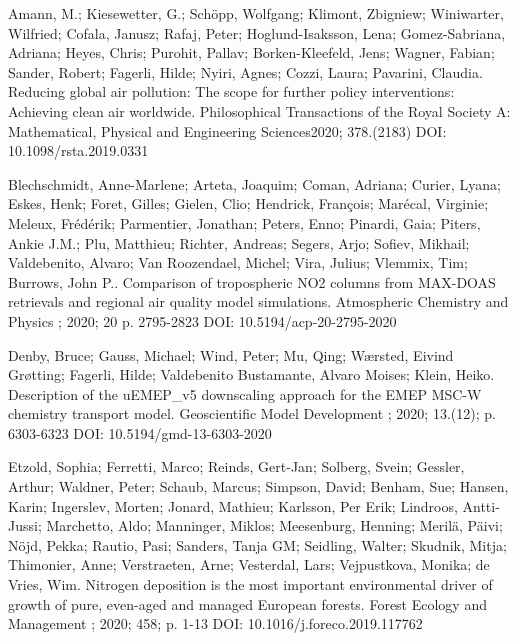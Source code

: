 \enlargethispage{\baselineskip}
\begin{list}{}{\setlength{\leftmargin}{15pt}\setlength{\itemindent}{-\leftmargin}}\small
\item[]
Amann, M.; Kiesewetter, G.; Schöpp, Wolfgang; Klimont, Zbigniew; Winiwarter, Wilfried; Cofala, Janusz; Rafaj, Peter; Hoglund-Isaksson, Lena; Gomez-Sabriana, Adriana; Heyes, Chris; Purohit, Pallav; Borken-Kleefeld, Jens; Wagner, Fabian; Sander, Robert; Fagerli, Hilde; Nyiri, Agnes; Cozzi, Laura; Pavarini, Claudia.
Reducing global air pollution: The scope for further policy interventions: Achieving clean air worldwide.
Philosophical Transactions of the Royal Society A: Mathematical, Physical and Engineering Sciences2020; 378.(2183)
DOI: 10.1098/rsta.2019.0331

\item[]
Blechschmidt, Anne-Marlene; Arteta, Joaquim; Coman, Adriana; Curier, Lyana; Eskes, Henk; Foret, Gilles; Gielen, Clio; Hendrick, François; Marécal, Virginie; Meleux, Frédérik; Parmentier, Jonathan; Peters, Enno; Pinardi, Gaia; Piters, Ankie J.M.; Plu, Matthieu; Richter, Andreas; Segers, Arjo; Sofiev, Mikhail; Valdebenito, Alvaro; Van Roozendael, Michel; Vira, Julius; Vlemmix, Tim; Burrows, John P..
Comparison of tropospheric NO2 columns from MAX-DOAS retrievals and regional air quality model simulations.
Atmospheric Chemistry and Physics ; 2020; 20 p. 2795-2823
DOI: 10.5194/acp-20-2795-2020 

\item[]
Denby, Bruce; Gauss, Michael; Wind, Peter; Mu, Qing; Wærsted, Eivind Grøtting; Fagerli, Hilde; Valdebenito Bustamante, Alvaro Moises; Klein, Heiko.
Description of the uEMEP_v5 downscaling approach for the EMEP MSC-W chemistry transport model.
Geoscientific Model Development ; 2020; 13.(12); p. 6303-6323
DOI: 10.5194/gmd-13-6303-2020 

\item[]
Etzold, Sophia; Ferretti, Marco; Reinds, Gert-Jan; Solberg, Svein; Gessler, Arthur; Waldner, Peter; Schaub, Marcus; Simpson, David; Benham, Sue; Hansen, Karin; Ingerslev, Morten; Jonard, Mathieu; Karlsson, Per Erik; Lindroos, Antti-Jussi; Marchetto, Aldo; Manninger, Miklos; Meesenburg, Henning; Merilä, Päivi; Nöjd, Pekka; Rautio, Pasi; Sanders, Tanja GM; Seidling, Walter; Skudnik, Mitja; Thimonier, Anne; Verstraeten, Arne; Vesterdal, Lars; Vejpustkova, Monika; de Vries, Wim.
Nitrogen deposition is the most important environmental driver of growth of pure, even-aged and managed European forests.
Forest Ecology and Management ; 2020; 458; p. 1-13
DOI: 10.1016/j.foreco.2019.117762


\end{list}

